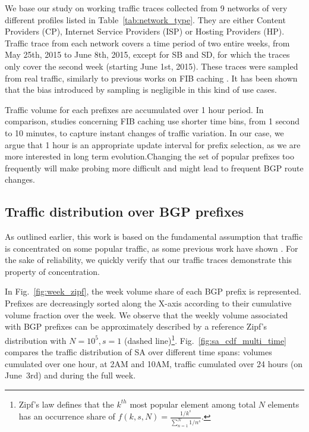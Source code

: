 \documentclass[10pt, conference,letterpaper]{IEEEtran}
\begin{document}
We base our study on working traffic traces collected from 9 networks of very different profiles listed in Table~\ref{tab:network_type}. 
They are either Content Providers (CP), Internet Service Providers (ISP) or Hosting Providers (HP). 
Traffic trace from each network covers a time period of two entire weeks, from May 25th, 2015 to June 8th, 2015, except for SB and SD, for which the traces only cover the second week (starting  June 1st, 2015).
These traces were sampled from real traffic, similarly to previous works on FIB caching \cite{Kim2009, Zhang2012}.
It has been shown that the bias introduced by sampling is negligible in this kind of use cases.



Traffic volume  for each prefixes are accumulated over 1 hour period.
In comparison, studies concerning FIB caching \cite{Sarrar2012, Zhang2012} use shorter time bins, from 1 second to 10 minutes, to capture instant changes of traffic variation.
In our case, we argue that 1 hour is an appropriate update interval for prefix selection, as we are more interested in long term evolution.Changing the set of popular prefixes too frequently will make probing more difficult and might lead to frequent BGP route changes. 


\subsection{Traffic distribution over BGP prefixes}
\label{sec:dis}
As outlined earlier, this work is based on the fundamental assumption that traffic is concentrated on some popular traffic, as some previous work have shown \cite{Fang1999,Feamster2003, Wallerich2006}. For the sake of reliability, we quickly verify that our traffic traces demonstrate this property of concentration. 

In Fig.~\ref{fig:week_zipf}, the week volume share of each BGP prefix is represented. Prefixes are decreasingly sorted along the X-axis according to their cumulative volume fraction over the week.
We observe that the weekly volume associated with BGP prefixes can be approximately described by a reference Zipf's distribution with $N=10^5, s=1$ (dashed line)\footnote{Zipf's law defines that the $k^{th}$ most popular element among total $N$ elements has an occurrence share of $f(k,s,N)=\frac{1/k^s}{\sum_{n=1}^{N}1/n^s}$.}. 
Fig.~\ref{fig:sa_cdf_multi_time} compares the traffic distribution of SA over different time spans: volumes cumulated over one hour, at 2AM and 10AM, traffic cumulated over 24 hours (on June~3rd) and during the full week.
\end{document}
